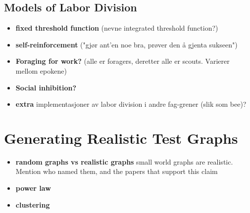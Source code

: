 \subsection{Models of Labor Division}
\begin{itemize}
    \item[] \textbf{fixed threshold function} (nevne integrated threshold function?)
    \item[] \textbf{self\@{-}reinforcement} ("gjør ant’en noe bra, prøver den å gjenta sukseen")
    \item[] \textbf{Foraging for work?} (alle er foragers, deretter alle er scouts. Varierer mellom epokene)
    \item[] \textbf{Social inhibition?}
    \item[] \textbf{extra} implementasjoner av labor division i andre fag-grener (slik som bee)?
\end{itemize}



\section{Generating Realistic Test Graphs}
\begin{itemize}
    \item[] \textbf{random graphs vs realistic graphs} small world graphs are realistic. Mention who named them, and the papers that support this claim
    \item[] \textbf{power law} 
    \item[] \textbf{clustering}
\end{itemize}



